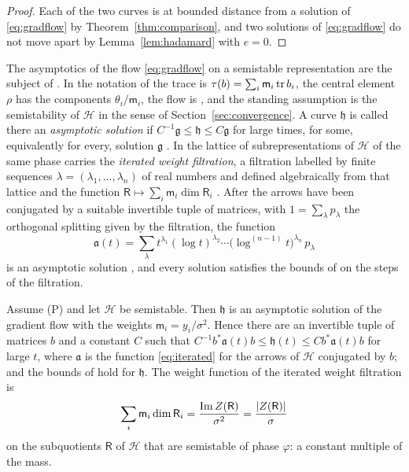 \begin{proof}
Each of the two curves is at bounded distance from a solution of
\eqref{eq:gradflow} by Theorem~\ref{thm:comparison}, and two solutions of
\eqref{eq:gradflow} do not move apart by Lemma~\ref{lem:hadamard} with $e=0$.
\end{proof}

The asymptotics of the flow \eqref{eq:gradflow} on a semistable
representation are the subject of \cite{hkkp23}. In the notation of
\cite[\S5.2]{hkkp23} the trace is $\tau(b)=\sum_i\mathsf m_i\operatorname{tr} b_i$, the
central element $\rho$ has the components $\theta_i/\mathsf m_i$, the flow is
\cite[(5.28)]{hkkp23}, and the standing assumption \cite[(5.59)]{hkkp23} is
the semistability of $\mathcal H$ in the sense of
Section~\ref{sec:convergence}. A curve $\mathfrak h$ is called there an
\emph{asymptotic solution} if $C^{-1}\mathfrak g\leq\mathfrak h\leq C\mathfrak g$
for large times, for some, equivalently for every, solution $\mathfrak g$
\cite[\S5.3]{hkkp23}. In \cite[\S5.4]{hkkp23} the lattice of
subrepresentations of $\mathcal H$ of the same phase carries the
\emph{iterated weight filtration}, a filtration labelled by finite sequences
$\lambda=(\lambda_1,\dots,\lambda_n)$ of real numbers and defined
algebraically from that lattice and the function
$\mathsf R\mapsto\sum_i\mathsf m_i\dim\mathsf R_i$
\cite[\S4 and (5.58)]{hkkp23}. After the arrows have been conjugated by a
suitable invertible tuple of matrices, with $1=\sum_\lambda p_\lambda$ the
orthogonal splitting given by the filtration, the function
\begin{equation}\label{eq:iterated}
 \mathfrak a(t)=\sum_{\lambda}t^{\lambda_1}(\log t)^{\lambda_2}\cdots\bigl(\log^{(n-1)}t\bigr)^{\lambda_n}\,p_\lambda
\end{equation}
is an asymptotic solution \cite[Corollary~5.10]{hkkp23}, and every solution
satisfies the bounds of \cite[Theorem~5.11]{hkkp23} on the steps of the
filtration.

\begin{corollary}\label{cor:iterated}
Assume (P) and let $\mathcal H$ be semistable. Then $\mathfrak h$ is an
asymptotic solution of the gradient flow \cite[(5.28)]{hkkp23} with the
weights $\mathsf m_i=y_i/\sigma^2$. Hence there are an invertible tuple of
matrices $b$ and a constant $C$ such that
$C^{-1}b^*\mathfrak a(t)b\leq\mathfrak h(t)\leq Cb^*\mathfrak a(t)b$ for large
$t$, where $\mathfrak a$ is the function \eqref{eq:iterated} for the arrows
of $\mathcal H$ conjugated by $b$; and the bounds of
\cite[Theorem~5.11]{hkkp23} hold for $\mathfrak h$. The weight function of
the iterated weight filtration is
\[
 \sum_i\mathsf m_i\dim\mathsf R_i=\frac{\operatorname{Im} Z(\mathsf R)}{\sigma^2}=\frac{|Z(\mathsf R)|}\sigma
\]
on the subquotients $\mathsf R$ of $\mathcal H$ that are semistable of phase
$\varphi$: a constant multiple of the mass.
\end{corollary}

